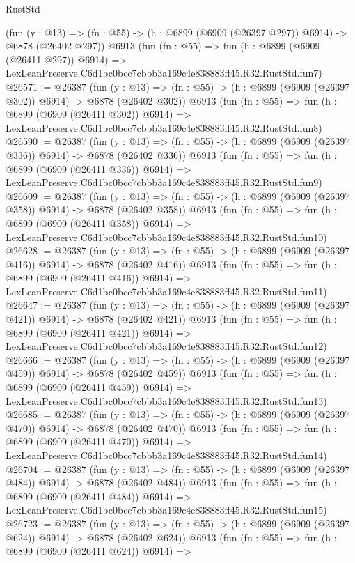 \begin{lexlean}{RustStd}
\begin{coremodule}
    (fun (y : @13) => (fn : @55) -> (h : @6899 (@6909 (@26397 @297)) @6914) -> @6878 (@26402 @297))
    @6913
    (fun (fn : @55) =>
    fun (h : @6899 (@6909 (@26411 @297)) @6914) =>
    LexLeanPreserve.C6d1bc0bcc7cbbb3a169c4e838883ff45.R32.RustStd.fun7)
@26571 := @26387
    (fun (y : @13) => (fn : @55) -> (h : @6899 (@6909 (@26397 @302)) @6914) -> @6878 (@26402 @302))
    @6913
    (fun (fn : @55) =>
    fun (h : @6899 (@6909 (@26411 @302)) @6914) =>
    LexLeanPreserve.C6d1bc0bcc7cbbb3a169c4e838883ff45.R32.RustStd.fun8)
@26590 := @26387
    (fun (y : @13) => (fn : @55) -> (h : @6899 (@6909 (@26397 @336)) @6914) -> @6878 (@26402 @336))
    @6913
    (fun (fn : @55) =>
    fun (h : @6899 (@6909 (@26411 @336)) @6914) =>
    LexLeanPreserve.C6d1bc0bcc7cbbb3a169c4e838883ff45.R32.RustStd.fun9)
@26609 := @26387
    (fun (y : @13) => (fn : @55) -> (h : @6899 (@6909 (@26397 @358)) @6914) -> @6878 (@26402 @358))
    @6913
    (fun (fn : @55) =>
    fun (h : @6899 (@6909 (@26411 @358)) @6914) =>
    LexLeanPreserve.C6d1bc0bcc7cbbb3a169c4e838883ff45.R32.RustStd.fun10)
@26628 := @26387
    (fun (y : @13) => (fn : @55) -> (h : @6899 (@6909 (@26397 @416)) @6914) -> @6878 (@26402 @416))
    @6913
    (fun (fn : @55) =>
    fun (h : @6899 (@6909 (@26411 @416)) @6914) =>
    LexLeanPreserve.C6d1bc0bcc7cbbb3a169c4e838883ff45.R32.RustStd.fun11)
@26647 := @26387
    (fun (y : @13) => (fn : @55) -> (h : @6899 (@6909 (@26397 @421)) @6914) -> @6878 (@26402 @421))
    @6913
    (fun (fn : @55) =>
    fun (h : @6899 (@6909 (@26411 @421)) @6914) =>
    LexLeanPreserve.C6d1bc0bcc7cbbb3a169c4e838883ff45.R32.RustStd.fun12)
@26666 := @26387
    (fun (y : @13) => (fn : @55) -> (h : @6899 (@6909 (@26397 @459)) @6914) -> @6878 (@26402 @459))
    @6913
    (fun (fn : @55) =>
    fun (h : @6899 (@6909 (@26411 @459)) @6914) =>
    LexLeanPreserve.C6d1bc0bcc7cbbb3a169c4e838883ff45.R32.RustStd.fun13)
@26685 := @26387
    (fun (y : @13) => (fn : @55) -> (h : @6899 (@6909 (@26397 @470)) @6914) -> @6878 (@26402 @470))
    @6913
    (fun (fn : @55) =>
    fun (h : @6899 (@6909 (@26411 @470)) @6914) =>
    LexLeanPreserve.C6d1bc0bcc7cbbb3a169c4e838883ff45.R32.RustStd.fun14)
@26704 := @26387
    (fun (y : @13) => (fn : @55) -> (h : @6899 (@6909 (@26397 @484)) @6914) -> @6878 (@26402 @484))
    @6913
    (fun (fn : @55) =>
    fun (h : @6899 (@6909 (@26411 @484)) @6914) =>
    LexLeanPreserve.C6d1bc0bcc7cbbb3a169c4e838883ff45.R32.RustStd.fun15)
@26723 := @26387
    (fun (y : @13) => (fn : @55) -> (h : @6899 (@6909 (@26397 @624)) @6914) -> @6878 (@26402 @624))
    @6913
    (fun (fn : @55) =>
    fun (h : @6899 (@6909 (@26411 @624)) @6914) =>

\end{coremodule}
\end{lexlean}
